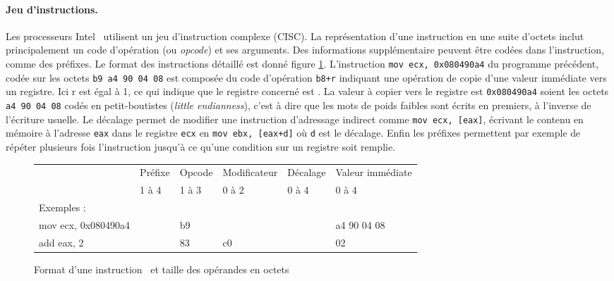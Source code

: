 \paragraph{Jeu d'instructions.}
Les processeurs Intel \xq\ utilisent un jeu d'instruction complexe (CISC). La représentation d'une instruction en une suite d'octets inclut principalement un code d'opération (ou \emph{opcode}) et ses arguments. Des informations supplémentaire peuvent être codées dans l'instruction, comme des préfixes. Le format des instructions détaillé est donné figure \ref{fig:format_insts_x86}.
L'instruction \texttt{mov ecx, 0x080490a4} du programme précédent, codée sur les octets \texttt{b9 a4 90 04 08} est composée du code d'opération \texttt{b8+r} indiquant une opération de copie d'une valeur immédiate vers un registre. Ici r est égal à 1, ce qui indique que le registre concerné est \ecx. La valeur à copier vers le registre est \texttt{0x080490a4} soient les octets \texttt{a4 90 04 08} codés en petit-boutistes (\emph{little endianness}), c'est à dire que les mots de poids faibles sont écrits en premiers, à l'inverse de l'écriture usuelle.
Le décalage permet de modifier une instruction d'adressage indirect comme \texttt{mov ecx, [eax]}, écrivant le contenu en mémoire à l'adresse \texttt{eax} dans le registre \texttt{ecx} en \texttt{mov ebx, [eax+d]} où \texttt{d} est le décalage.
Enfin les préfixes permettent par exemple de répéter plusieurs fois l'instruction jusqu'à ce qu'une condition sur un registre soit remplie.

\begin{figure}[h]
\begin{center} 
\begin{tabular}{l|l|l|l|l|l|}
\cline{2-6}
& Préfixe & Opcode & Modificateur & Décalage & Valeur immédiate \\
& 1 à 4 & 1 à 3 & 0 à 2 & 0 à 4 & 0 à 4\\
\cline{2-6}
\multicolumn{1}{l}{Exemples :} & \multicolumn{5}{l}{}\\
\hline
\multicolumn{1}{|l|}{mov ecx, 0x080490a4} & & b9 & & & a4 90 04 08 \\
\multicolumn{1}{|l|}{add eax, 2} & & 83 & c0 & & 02 \\
\hline
\end{tabular}
\end{center} 
\caption{Format d'une instruction \xq\ et taille des opérandes en octets}
\label{fig:format_insts_x86}
\end{figure}

